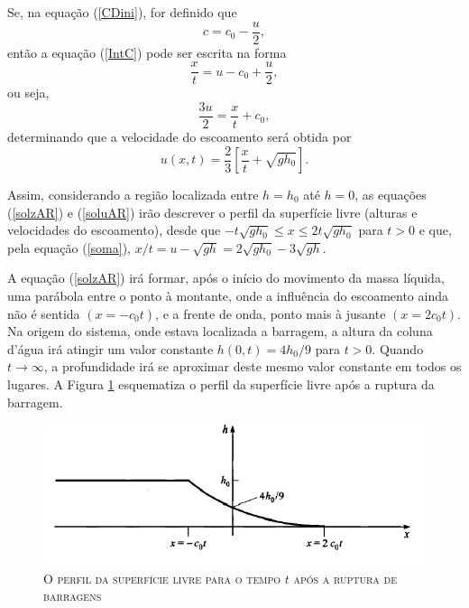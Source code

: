 Se, na equação (\ref{CDini}), for definido que
\begin{equation*}
c = c_0 - \frac{u}{2},
\end{equation*}
então a equação (\ref{IntC}) pode ser escrita na forma
\begin{equation*}
\frac{x}{t} = u - c_0 + \frac{u}{2},
\end{equation*}
ou seja,
\begin{equation*}
\frac{3u}{2} = \frac{x}{t} + c_0,
\end{equation*}
determinando que a velocidade do escoamento será obtida por
\begin{equation} \label{soluAR}
u(x,t)= \frac{2}{3} \left[ \frac{x}{t} + \sqrt{gh_0} \right].
\end{equation}

Assim, considerando a região localizada entre $h=h_0$ até $h=0$, as equações (\ref{solzAR}) e (\ref{soluAR}) irão descrever o perfil da superfície livre (alturas e velocidades do escoamento), desde que $-t \sqrt{gh_0} \leq x \leq 2t \sqrt{gh_0}$ para $t>0$ e que, pela equação (\ref{soma}), $x/t=u- \sqrt{gh} =2 \sqrt{gh_0} - 3 \sqrt{gh}$.

A equação (\ref{solzAR}) irá formar, após o início do movimento da massa líquida, uma parábola entre o ponto à montante, onde a influência do escoamento ainda não é sentida $(x=-c_0 t)$, e a frente de onda, ponto mais à jusante $(x=2c_0 t)$. Na origem do sistema, onde estava localizada a barragem, a altura da coluna d'água irá atingir um valor constante $h(0,t)= 4h_0 / 9$ para $t>0$. Quando $t\longrightarrow \infty$, a profundidade irá se aproximar deste mesmo valor constante em todos os lugares. A Figura \ref{ondalonga} esquematiza o perfil da superfície livre após a ruptura da barragem.


\begin{figure}[H]
	\centering
	\includegraphics[scale=1]{figuras/ondalonga.jpg}	%
	\caption{\textsc{O perfil da superfície livre para o tempo $t$ após a ruptura de barragens}}
	\vspace{-0.1cm}
	\label{ondalonga}
\end{figure}
     



